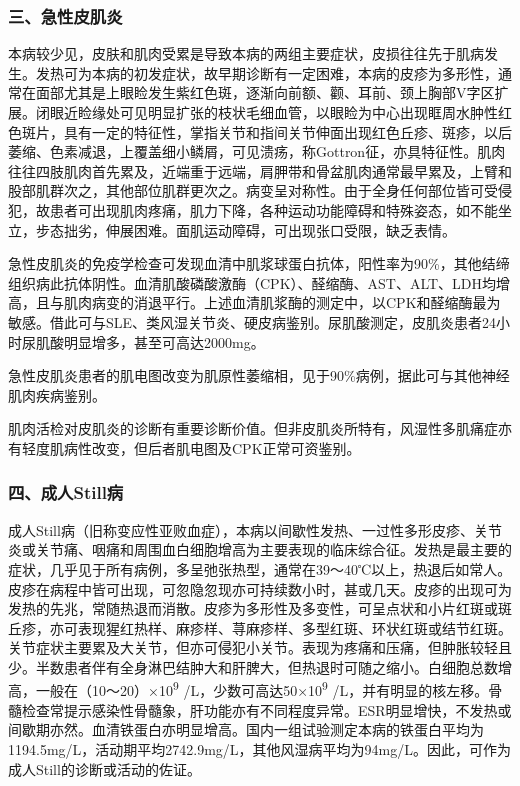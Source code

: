 \subsubsection{三、急性皮肌炎}

本病较少见，皮肤和肌肉受累是导致本病的两组主要症状，皮损往往先于肌病发生。发热可为本病的初发症状，故早期诊断有一定困难，本病的皮疹为多形性，通常在面部尤其是上眼睑发生紫红色斑，逐渐向前额、颧、耳前、颈上胸部V字区扩展。闭眼近睑缘处可见明显扩张的枝状毛细血管，以眼睑为中心出现眶周水肿性红色斑片，具有一定的特征性，掌指关节和指间关节伸面出现红色丘疹、斑疹，以后萎缩、色素减退，上覆盖细小鳞屑，可见溃疡，称Gottron征，亦具特征性。肌肉往往四肢肌肉首先累及，近端重于远端，肩胛带和骨盆肌肉通常最早累及，上臂和股部肌群次之，其他部位肌群更次之。病变呈对称性。由于全身任何部位皆可受侵犯，故患者可出现肌肉疼痛，肌力下降，各种运动功能障碍和特殊姿态，如不能坐立，步态拙劣，伸展困难。面肌运动障碍，可出现张口受限，缺乏表情。

急性皮肌炎的免疫学检查可发现血清中肌浆球蛋白抗体，阳性率为90\%，其他结缔组织病此抗体阴性。血清肌酸磷酸激酶（CPK）、醛缩酶、AST、ALT、LDH均增高，且与肌肉病变的消退平行。上述血清肌浆酶的测定中，以CPK和醛缩酶最为敏感。借此可与SLE、类风湿关节炎、硬皮病鉴别。尿肌酸测定，皮肌炎患者24小时尿肌酸明显增多，甚至可高达2000mg。

急性皮肌炎患者的肌电图改变为肌原性萎缩相，见于90\%病例，据此可与其他神经肌肉疾病鉴别。

肌肉活检对皮肌炎的诊断有重要诊断价值。但非皮肌炎所特有，风湿性多肌痛症亦有轻度肌病性改变，但后者肌电图及CPK正常可资鉴别。

\subsubsection{四、成人Still病}

成人Still病（旧称变应性亚败血症），本病以间歇性发热、一过性多形皮疹、关节炎或关节痛、咽痛和周围血白细胞增高为主要表现的临床综合征。发热是最主要的症状，几乎见于所有病例，多呈弛张热型，通常在39～40℃以上，热退后如常人。皮疹在病程中皆可出现，可忽隐忽现亦可持续数小时，甚或几天。皮疹的出现可为发热的先兆，常随热退而消散。皮疹为多形性及多变性，可呈点状和小片红斑或斑丘疹，亦可表现猩红热样、麻疹样、荨麻疹样、多型红斑、环状红斑或结节红斑。关节症状主要累及大关节，但亦可侵犯小关节。表现为疼痛和压痛，但肿胀较轻且少。半数患者伴有全身淋巴结肿大和肝脾大，但热退时可随之缩小。白细胞总数增高，一般在（10～20）×10\textsuperscript{9}
/L，少数可高达50×10\textsuperscript{9}
/L，并有明显的核左移。骨髓检查常提示感染性骨髓象，肝功能亦有不同程度异常。ESR明显增快，不发热或间歇期亦然。血清铁蛋白亦明显增高。国内一组试验测定本病的铁蛋白平均为1194.5mg/L，活动期平均2742.9mg/L，其他风湿病平均为94mg/L。因此，可作为成人Still的诊断或活动的佐证。

